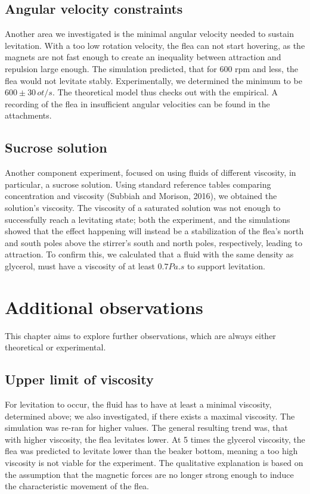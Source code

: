 \documentclass[10pt,a4paper]{article}
\begin{document}
\subsection{Angular velocity constraints}

Another area we investigated is the minimal angular velocity needed to sustain levitation. With a too low rotation velocity, the flea can not start hovering, as the magnets are not fast enough to create an inequality between attraction and repulsion large enough. The simulation predicted, that for 600 rpm and less, the flea would not levitate stably. Experimentally, we determined the minimum to be $600 \pm 30 \, ot/s$. The theoretical model thus checks out with the empirical. A recording of the flea in insufficient angular velocities can be found in the attachments.

\subsection{Sucrose solution}

Another component experiment, focused on using fluids of different viscosity, in particular, a sucrose solution. Using standard reference tables comparing concentration and viscosity (Subbiah and Morison, 2016), we obtained the solution's viscosity. The viscosity of a saturated solution was not enough to successfully reach a levitating state; both the experiment, and the simulations showed that the effect happening will instead be a stabilization of the flea's north and south poles above the stirrer's south and north poles, respectively, leading to attraction. To confirm this, we calculated that a fluid with the same density as glycerol, must have a viscosity of at least $0.7 Pa.s$ to support levitation.

\section{Additional observations}
This chapter aims to explore further observations, which are always either theoretical or experimental.

\subsection{Upper limit of viscosity}
For levitation to occur, the fluid has to have at least a minimal viscosity, determined above; we also investigated, if there exists a maximal viscosity. The simulation was re-ran for higher values. The general resulting trend was, that with higher viscosity, the flea levitates lower. At 5 times the glycerol viscosity, the flea was predicted to levitate lower than the beaker bottom, meaning a too high viscosity is not viable for the experiment. The qualitative explanation is based on the assumption that the magnetic forces are no longer strong enough to induce the characteristic movement of the flea.
\end{document}
